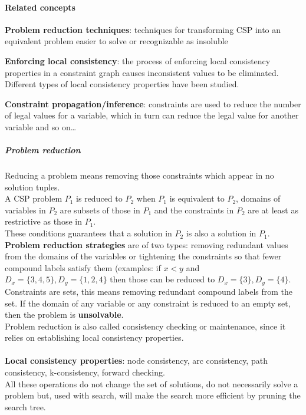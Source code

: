 \documentclass[10pt]{report}
\begin{document}
\paragraph{Related concepts} \begin{list}{}{}
	\item \textbf{Problem reduction techniques}: techniques for transforming CSP into an equivalent problem easier to solve or recognizable as insoluble
	\item \textbf{Enforcing local consistency}: the process of enforcing local consistency properties in a constraint graph causes inconsistent values to be eliminated. Different types of local consistency properties have been studied.
	\item \textbf{Constraint propagation/inference}: constraints are used to reduce the number of legal values for a variable, which in turn can reduce the legal value for another variable and so on\ldots
\end{list}
\subparagraph{Problem reduction} Reducing a problem means removing those constraints which appear in no solution tuples.\\
A CSP problem $P_1$ is reduced to $P_2$ when $P_1$ is equivalent to $P_2$, domains of variables in $P_2$ are subsets of those in $P_1$ and the constraints in $P_2$ are at least as restrictive as those in $P_1$.\\
These conditions guarantees that a solution in $P_2$ is also a solution in $P_1$.\\
\textbf{Problem reduction strategies} are of two types: removing redundant values from the domains of the variables or tightening the constraints so that fewer compound labels satisfy them (examples: if $x < y$ and $D_x = \{3,4,5\}, D_y = \{1, 2,4\}$ then those can be reduced to $D_x=\{3\}, D_y=\{4\}$.\\
Constraints are sets, this means removing redundant compound labels from the set. If the domain of any variable or any constraint is reduced to an empty set, then the problem is \textbf{unsolvable}.\\
Problem reduction is also called consistency checking or maintenance, since it relies on establishing local consistency properties.\\\\
\textbf{Local consistency properties}: node consistency, arc consistency, path consistency, k-consistency, forward checking.\\
All these operations do not change the set of solutions, do not necessarily solve a problem but, used with search, will make the search more efficient by pruning the search tree.
\end{document}
